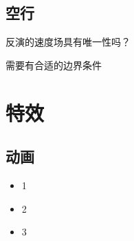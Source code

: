 \subsection{空行}
\begin{frame}
	反演的速度场具有唯一性吗？
	
	\qquad
	
	\qquad
	

	需要有合适的边界条件
\end{frame}

\section{特效}
\subsection{动画}
\begin{frame}
	\begin{itemize}
		\item 1
		\item 2
		\pause
		\item 3
	\end{itemize}
\end{frame}


